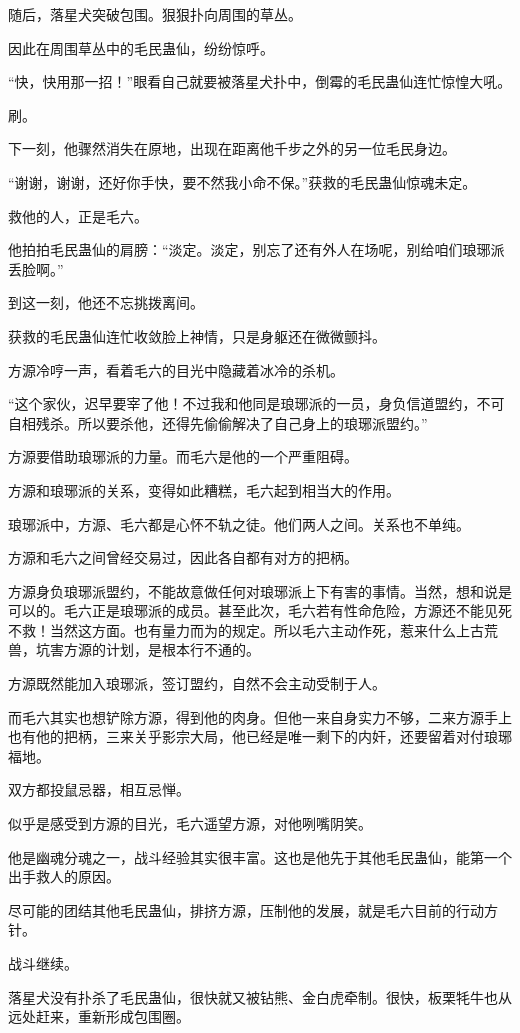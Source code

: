 \begin{this_body}
随后，落星犬突破包围。狠狠扑向周围的草丛。

因此在周围草丛中的毛民蛊仙，纷纷惊呼。

“快，快用那一招！”眼看自己就要被落星犬扑中，倒霉的毛民蛊仙连忙惊惶大吼。

刷。

下一刻，他骤然消失在原地，出现在距离他千步之外的另一位毛民身边。

“谢谢，谢谢，还好你手快，要不然我小命不保。”获救的毛民蛊仙惊魂未定。

救他的人，正是毛六。

他拍拍毛民蛊仙的肩膀：“淡定。淡定，别忘了还有外人在场呢，别给咱们琅琊派丢脸啊。”

到这一刻，他还不忘挑拨离间。

获救的毛民蛊仙连忙收敛脸上神情，只是身躯还在微微颤抖。

方源冷哼一声，看着毛六的目光中隐藏着冰冷的杀机。

“这个家伙，迟早要宰了他！不过我和他同是琅琊派的一员，身负信道盟约，不可自相残杀。所以要杀他，还得先偷偷解决了自己身上的琅琊派盟约。”

方源要借助琅琊派的力量。而毛六是他的一个严重阻碍。

方源和琅琊派的关系，变得如此糟糕，毛六起到相当大的作用。

琅琊派中，方源、毛六都是心怀不轨之徒。他们两人之间。关系也不单纯。

方源和毛六之间曾经交易过，因此各自都有对方的把柄。

方源身负琅琊派盟约，不能故意做任何对琅琊派上下有害的事情。当然，想和说是可以的。毛六正是琅琊派的成员。甚至此次，毛六若有性命危险，方源还不能见死不救！当然这方面。也有量力而为的规定。所以毛六主动作死，惹来什么上古荒兽，坑害方源的计划，是根本行不通的。

方源既然能加入琅琊派，签订盟约，自然不会主动受制于人。

而毛六其实也想铲除方源，得到他的肉身。但他一来自身实力不够，二来方源手上也有他的把柄，三来关乎影宗大局，他已经是唯一剩下的内奸，还要留着对付琅琊福地。

双方都投鼠忌器，相互忌惮。

似乎是感受到方源的目光，毛六遥望方源，对他咧嘴阴笑。

他是幽魂分魂之一，战斗经验其实很丰富。这也是他先于其他毛民蛊仙，能第一个出手救人的原因。

尽可能的团结其他毛民蛊仙，排挤方源，压制他的发展，就是毛六目前的行动方针。

战斗继续。

落星犬没有扑杀了毛民蛊仙，很快就又被钻熊、金白虎牵制。很快，板栗牦牛也从远处赶来，重新形成包围圈。


\end{this_body}
